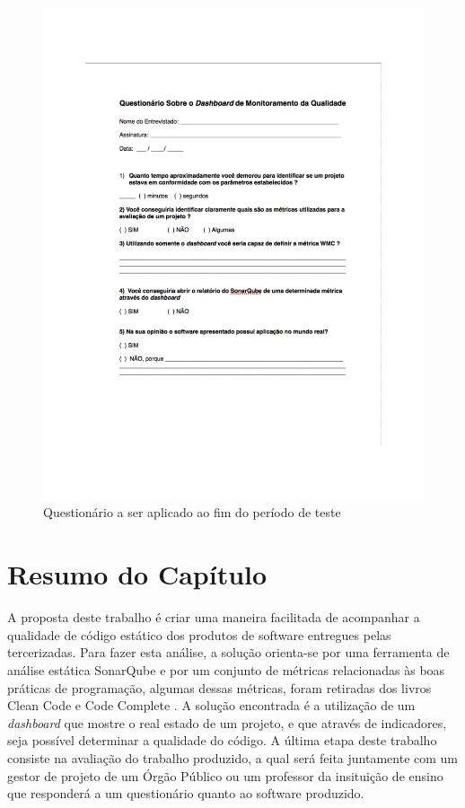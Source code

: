 \graphicspath{{figuras/}}
\begin{figure}[h!]
\centering
\includegraphics[scale=1.00]{questionario}
\caption{Questionário a ser aplicado ao fim do período de teste}
\label{img:questionario}
\end{figure}

\section{Resumo do Capítulo}
A proposta deste trabalho é criar uma maneira facilitada de acompanhar a qualidade de código estático dos produtos de software entregues pelas tercerizadas. Para fazer esta análise, a solução orienta-se por uma ferramenta de análise estática SonarQube e por um conjunto de métricas relacionadas às boas práticas de programação, algumas dessas métricas, foram retiradas dos livros Clean Code \cite{martin2009clean} e Code Complete \cite{mcconnell2004code}. A solução encontrada é a utilização de um \textit{dashboard} que mostre o real estado de um projeto, e que através de indicadores, seja possível determinar a qualidade do código. A última etapa deste trabalho consiste na avaliação do trabalho produzido, a qual será feita juntamente com um gestor de projeto de um Órgão Público ou um professor da insituição de ensino que responderá a um questionário quanto ao software produzido.